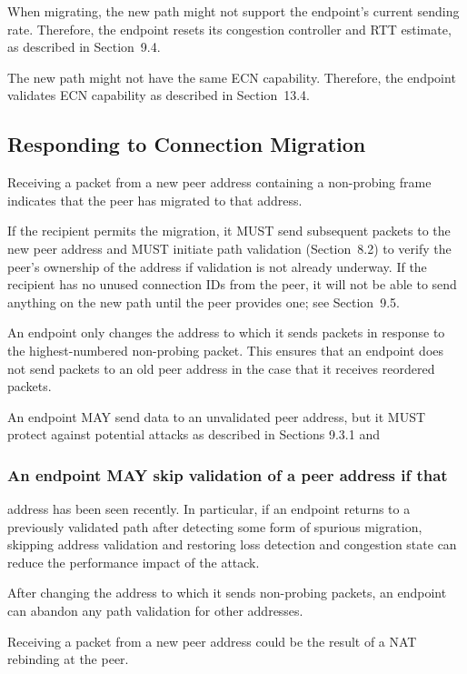 \documentclass{article}
\begin{document}
When migrating, the new path might not support the endpoint's current sending rate.  Therefore, the endpoint resets its congestion controller and RTT estimate, as described in Section~9.4.

The new path might not have the same ECN capability.  Therefore, the endpoint validates ECN capability as described in Section~13.4.

\subsection{Responding to Connection Migration}

Receiving a packet from a new peer address containing a non-probing frame indicates that the peer has migrated to that address.

If the recipient permits the migration, it MUST send subsequent packets to the new peer address and MUST initiate path validation (Section~8.2) to verify the peer's ownership of the address if validation is not already underway.  If the recipient has no unused connection IDs from the peer, it will not be able to send anything on the new path until the peer provides one; see Section~9.5.

An endpoint only changes the address to which it sends packets in response to the highest-numbered non-probing packet.  This ensures that an endpoint does not send packets to an old peer address in the case that it receives reordered packets.

An endpoint MAY send data to an unvalidated peer address, but it MUST protect against potential attacks as described in Sections 9.3.1 and

\subsubsection{An endpoint MAY skip validation of a peer address if that}

address has been seen recently.  In particular, if an endpoint returns to a previously validated path after detecting some form of spurious migration, skipping address validation and restoring loss detection and congestion state can reduce the performance impact of the attack.

After changing the address to which it sends non-probing packets, an endpoint can abandon any path validation for other addresses.

Receiving a packet from a new peer address could be the result of a NAT rebinding at the peer.
\end{document}
